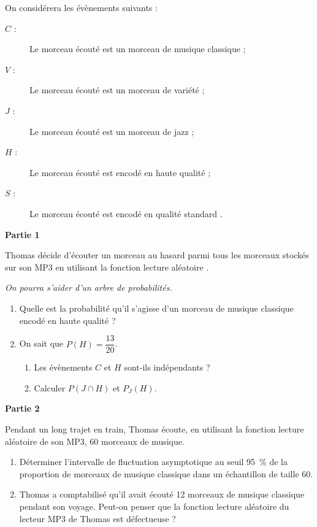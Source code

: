 \documentclass[10pt]{article}
\begin{document}
\medskip

On considérera les évènements suivants :

\begin{description}
\item[$C$ :] \og Le morceau écouté est un morceau de musique classique \fg{} ;
\item[$V$ :] \og Le morceau écouté est un morceau de variété \fg{} ;
\item[$J$ :] \og Le morceau écouté est un morceau de jazz \fg{} ;
\item[$H$ :] \og Le morceau écouté est encodé en haute qualité \fg{} ;
\item[$S$ :] \og Le morceau écouté est encodé en qualité standard \fg.
\end{description}

\medskip

\textbf{Partie 1}

\medskip

Thomas décide d'écouter un morceau au hasard parmi tous les morceaux stockés sur son MP3 en utilisant la fonction \og lecture aléatoire \fg{}.

\emph{On pourra s'aider d'un arbre de probabilités.}

\begin{enumerate}
\item Quelle est la probabilité qu'il s'agisse d'un morceau de musique classique encodé en haute qualité ?
\item On sait que $P(H)=\dfrac{13}{20}$.
	\begin{enumerate}
		\item Les évènements $C$ et $H$ sont-ils indépendants ?
		\item Calculer $P(J \cap H)$ et $P_J(H)$.
	\end{enumerate}
\end{enumerate}

\medskip

\textbf{Partie 2}

\medskip

Pendant un long trajet en train, Thomas écoute, en utilisant la fonction \og lecture aléatoire \fg{} de son MP3, 60 morceaux de musique.

\begin{enumerate}
\item Déterminer l'intervalle de fluctuation asymptotique au seuil 95~\% de la proportion de morceaux de musique classique dans un échantillon de taille 60.
\item Thomas a comptabilisé qu'il avait écouté 12 morceaux de musique classique pendant son voyage. Peut-on penser que la fonction \og lecture aléatoire \fg{} du lecteur MP3 de Thomas est défectueuse ?
\end{enumerate}
\end{document}
